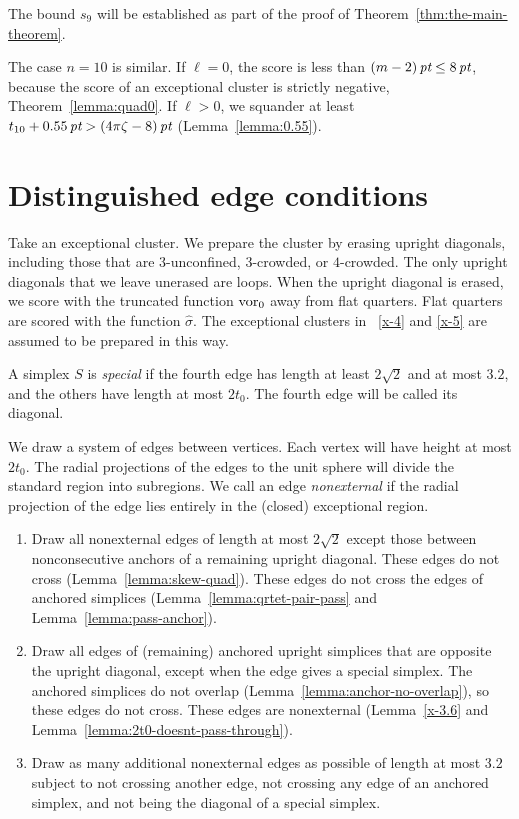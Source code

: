 The bound $s_9$ will be established as part of the proof of
Theorem~\ref{thm:the-main-theorem}.

The case $n=10$ is similar.  If $\ell=0$, the score is less than
    $(m-2)\,\hbox{\it pt}\le 8\,\hbox{\it pt}$,
because the score of an exceptional cluster is strictly negative,
Theorem~\ref{lemma:quad0}.  If $\ell>0$, we squander at least
    $t_{10}+ 0.55\,\hbox{\it pt} > (4\pi\zeta-8)\,\hbox{\it pt}$ (Lemma~\ref{lemma:0.55}).


\section{Distinguished edge conditions}

Take an exceptional cluster.  We prepare the cluster by erasing
upright diagonals, including those that are $3$-unconfined,
$3$-crowded, or $4$-crowded.  The only upright diagonals that we
leave unerased are loops.  When the upright diagonal is erased, we
score with the truncated function $\operatorname{vor}_0$ away from flat
quarters.  Flat quarters are scored with the function
$\hat\sigma$. The exceptional clusters in \Chaps~\ref{x-4} and
\ref{x-5} are assumed to be prepared in this way.


A simplex $S$ is {\it special\/} if the fourth edge has length at
least $2\sqrt{2}$ and at most $3.2$, and the others have length at
most $2t_0$. The fourth edge will be called its diagonal.


We draw a system of edges between vertices.  Each vertex will have
height at most $2t_0$.  The radial projections of the edges to the
unit sphere will divide the standard region into subregions. We
call an edge {\it nonexternal\/} if the radial projection of the
edge lies entirely in the (closed) exceptional region.

\begin{enumerate}
\item Draw all nonexternal edges of length at most $2\sqrt{2}$
except those between nonconsecutive anchors of a remaining upright
diagonal. These edges do not cross (Lemma~\ref{lemma:skew-quad}).
These edges do not cross the edges of anchored simplices
(Lemma~\ref{lemma:qrtet-pair-pass} and
Lemma~\ref{lemma:pass-anchor}).

\item Draw all edges of (remaining) anchored upright simplices
that are opposite the upright diagonal, except when the edge gives
a special simplex. The anchored simplices do not overlap
(Lemma~\ref{lemma:anchor-no-overlap}), so these edges do not
cross. These edges are nonexternal (Lemma~\ref{x-3.6} and
Lemma~\ref{lemma:2t0-doesnt-pass-through}).

\item Draw as many additional nonexternal edges as possible of
length at most $3.2$ subject to not crossing another edge, not
crossing any edge of an anchored simplex, and not being the
diagonal of a special simplex.
\end{enumerate}

